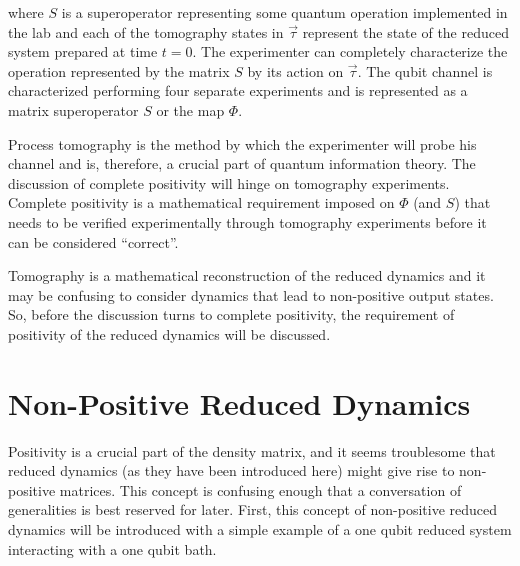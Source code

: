 where $S$ is a superoperator representing some quantum operation implemented in the lab and each of the tomography states in $\vec{\tau}$ represent the state of the reduced system prepared at time $t=0$.  The experimenter can completely characterize the operation represented by the matrix $S$ by its action on $\vec{\tau}$.  The qubit channel is characterized performing four separate experiments and is represented as a matrix superoperator $S$ or the map $\Phi$.     

Process tomography is the method by which the experimenter will probe his channel and is, therefore, a crucial part of quantum information theory.  The discussion of complete positivity will hinge on tomography experiments.  Complete positivity is a mathematical requirement imposed on $\Phi$ (and $S$) that needs to be verified experimentally through tomography experiments before it can be considered ``correct''.  

Tomography is a mathematical reconstruction of the reduced dynamics and it may be confusing to consider dynamics that lead to non-positive output states. So, before the discussion turns to complete positivity, the requirement of positivity of the reduced dynamics will be discussed. 

\section{Non-Positive Reduced Dynamics}
\label{sec:posdomain}

Positivity is a crucial part of the density matrix, and it seems troublesome that reduced dynamics (as they have been introduced here) might give rise to non-positive matrices.  This concept is confusing enough that a conversation of generalities is best reserved for later.  First, this concept of non-positive reduced dynamics will be introduced with a simple example of a one qubit reduced system interacting with a one qubit bath.

